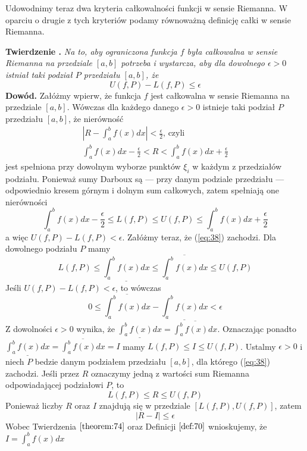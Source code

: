 \documentclass[leqno]{article}
\newcounter{thcounter}
\newcommand{\theorem}[1]{\noindent\refstepcounter{thcounter}\textbf{Twierdzenie \thethcounter. }\textit{#1}\label{theorem:\thethcounter}}
\newcommand{\proof}{\noindent\textbf{Dowód. }}
\begin{document}
\begin{justify}
Udowodnimy teraz dwa kryteria całkowalności funkcji w sensie Riemanna. W oparciu o drugie z tych kryteriów podamy równoważną definicję całki w sensie Riemanna.

\theorem{Na to, aby ograniczona funkcja $f$ była całkowalna w sensie Riemanna na przedziale $[a,b]$ potrzeba i wystarcza, aby dla dowolnego $\epsilon > 0$ istniał taki podział $P$ przedziału $[a,b]$, że}
\begin{equation}\label{eq:38}
U(f, P) - L(f, P) \leq \epsilon
\end{equation}
\proof{}Załóżmy wpierw, że funkcja $f$ jest całkowalna w sensie Riemanna na przedziale $[a,b]$. Wówczas dla każdego danego $\epsilon > 0$ istnieje taki podział $P$ przedziału $[a,b]$, że nierówność
\begin{equation*}
\begin{gathered}
    |R - \int_{a}^{b} f(x)dx| < \frac{\epsilon}{2} \text{, czyli} \\
    \int_{a}^{b} f(x)dx - \frac{\epsilon}{2} < R < \int_{a}^{b} f(x)dx + \frac{\epsilon}{2}
\end{gathered}
\end{equation*}
jest spełniona przy dowolnym wyborze punktów $\xi_i$ w każdym z przedziałów podziału. Ponieważ sumy Darboux są --- przy danym podziale przedziału --- odpowiednio kresem górnym i dolnym sum całkowych, zatem spełniają one nierówności
\[
\int_{a}^{b}f(x)dx - \frac{\epsilon}{2} \leq L(f,P) \leq U(f, P) \leq \int_{a}^{b}f(x)dx + \frac{\epsilon}{2}
\]
a więc $U(f, P) - L(f, P) < \epsilon$.
Załóżmy teraz, że (\ref{eq:38}) zachodzi. Dla dowolnego podziału $P$ mamy
\[
L(f, P) \leq \underline{\int_{a}^{b}f(x)dx} \leq \overline{\int_{a}^{b}f(x)dx} \leq U(f, P)
\]
Jeśli $U(f, P) - L(f, P) < \epsilon$, to wówczas
\[
0 \leq \overline{\int_{a}^{b}f(x)dx} - \underline{\int_{a}^{b}f(x)dx} < \epsilon
\]
Z dowolności $\epsilon > 0$ wynika, że $\underline{\int_{a}^{b}f(x)dx} = \overline{\int_{a}^{b}f(x)dx}$. Oznaczając ponadto $\underline{\int_{a}^{b}f(x)dx} = \overline{\int_{a}^{b}f(x)dx} = I$ mamy $L(f, P) \leq I \leq U(f, P)$.
Ustalmy $\epsilon > 0$ i niech $P$ bedzie danym podziałem przedziału $[a,b]$, dla którego (\ref{eq:38}) zachodzi. Jeśli przez $R$ oznaczymy jedną z wartości sum Riemanna odpowiadającej podziałowi $P$, to
\[
L(f,P) \leq R \leq U(f, P)
\]
Ponieważ liczby $R$ oraz $I$ znajdują się w przedziale $[L(f, P), U(f, P)]$, zatem
\[
|R - I| \leq \epsilon
\]
Wobec Twierdzenia $\ref{theorem:74}$ oraz Definicji $\ref{def:70}$ wnioskujemy, że $I = \int_{a}^{b}f(x)dx$


\end{justify}
\end{document}
